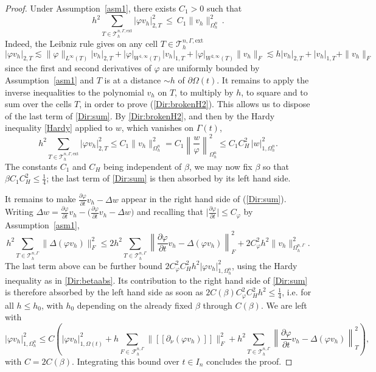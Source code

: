 \documentclass[11pt,a4paper]{article}
\theoremstyle{plain}
\theoremstyle{definition}
\theoremstyle{remark}
\numberwithin{equation}{section}
\begin{document}
\begin{proof}
	Under Assumption~\ref{asm1}, there exists $C_1>0$ such that
	\begin{equation}\label{Dir:brokenH2}
		h^2\sum_{T\in\mathcal{T}_h^{n,\Gamma,\textrm{ext}}}|\varphi v_h|_{2,T}^2 \ \leqslant\ C_1\|v_h\|_{\Omega^n_h}^2 \,.
	\end{equation}
	Indeed, the Leibniz rule gives on any cell $T\in\mathcal{T}_h^{n,\Gamma,\textrm{ext}}$
	\[
	|\varphi v_h|_{2,T} \lesssim \|\varphi\|_{L^\infty(T)} |v_h|_{2,T} + |\varphi|_{W^{1,\infty}(T)} |v_h|_{1,T}
	+  |\varphi|_{W^{2,\infty}(T)} \|v_h\|_{F}
	\lesssim h |v_h|_{2,T} + |v_h|_{1,T} + \|v_h\|_{F}
	\]
	since the first and second derivatives of $\varphi$ are uniformly bounded by Assumption~\ref{asm1} and $T$ is at a distance $\sim h$ of $\partial\Omega(t)$. It remains to apply the inverse inequalities to the polynomial $v_h$ on $T$, to multiply by $h$, to square and to sum over the cells $T$, in order to prove (\ref{Dir:brokenH2}).
This allows us  to dispose of the last term of \eqref{Dir:sum}. By
\eqref{Dir:brokenH2}, and then by the Hardy inequality \eqref{Hardy} applied to $w$, which vanishes on $\Gamma(t)$,
\begin{equation}\label{Dir:betaabs}
	h^2\sum_{T\in\mathcal{T}_h^{n,\Gamma,\textrm{ext}}}|\varphi v_h|_{2,T}^2 \leqslant C_1\|v_h\|_{\Omega_h^n}^2
	= C_1\left\|\frac{w}{\varphi}\right\|_{\Omega_h^n}^2
	\leqslant C_1C_H^2\,|w|_{1,\Omega_h^n}^2 .
\end{equation}
The constants $C_1$ and $C_H$ being independent of $\beta$, we may now fix $\beta$ so that $\beta C_1C_H^2\leqslant\frac14$; the last
term of \eqref{Dir:sum} is then absorbed by its left hand side. 

It remains to make $\frac{\partial\varphi}{\partial t}v_h-\Delta w$ appear in the right hand side of (\ref{Dir:sum}). Writing $\Delta w=\frac{\partial\varphi}{\partial t}
v_h-\big(\frac{\partial\varphi}{\partial t}v_h-\Delta w\big)$ and recalling
that $\big|\frac{\partial\varphi}{\partial t}\big|\leqslant C_\varphi$ by
Assumption~\ref{asm1},
\[
h^2\sum_{T\in\mathcal{T}_h^{n,\Gamma}}\|\Delta (\varphi v_h)\|_{F}^2
\leqslant 2h^2\sum_{T\in\mathcal{T}_h^{n,\Gamma}}
\left\|\frac{\partial\varphi}{\partial t}v_h-\Delta (\varphi v_h)\right\|_{F}^2
+ 2C_\varphi^2h^2\|v_h\|_{\Omega_h^{n,\Gamma}}^2 .
\]
The last term above can be further bound $2C_\varphi^2C_H^2h^2|\varphi v_h|_{1,\Omega_h^n}^2$, using  the Hardy inequality as in \eqref{Dir:betaabs}. Its contribution to the
right hand side of \eqref{Dir:sum} is therefore absorbed by the left hand
side as soon as $2C(\beta)C_\varphi^2C_H^2h^2\leqslant\frac14$, i.e. for all
$h\leqslant h_0$, with $h_0$ depending on the already fixed $\beta$ through $C(\beta)$. We are left with
\[
|\varphi v_h|_{1,\Omega_h^{n}}^2 \leqslant C\left(
|\varphi v_h|_{1,\Omega(t)}^2
+ h\sum_{F\in\mathcal{F}_h^{n,\Gamma}}
\big\| [\![ \partial_\nu (\varphi v_h) ]\!]\big\|_{F}^2
+ h^2\sum_{T\in\mathcal{T}_h^{n,\Gamma}}
\left\|\frac{\partial\varphi}{\partial t}v_h
-\Delta(\varphi v_h)\right\|_{T}^2 \right) ,
\]
with $C=2C(\beta)$. Integrating this bound over $t\in I_n$ concludes the proof.
\end{proof}
\end{document}
